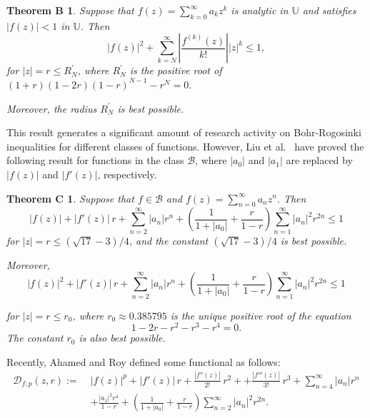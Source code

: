 \documentclass[11pt, reqno]{amsart}
\newtheorem*{theoB}{Theorem B}
\newtheorem*{theoC}{Theorem C}
\newtheorem*{cor A}{Corollary A}
\newtheorem*{cor B}{Corollary B}
\numberwithin{equation}{section}
\begin{document}
\begin{theoB}\cite[Corollary 2.3]{LSX2018}
Suppose that $f(z)=\sum_{k=0}^{\infty} a_k z^k$ is analytic in $\mathbb{U}$ and satisfies $|f(z)|<1$ in $\mathbb{U}$. Then
\[
|f(z)|^2+\sum_{k=N}^{\infty}\left|\frac{f^{(k)}(z)}{k!}\right|
|z|^k\leq 1,
\]
for $|z|=r\leq R_N^{\prime}$, where $R_N^{\prime}$ is the positive root of $(1+r)(1-2r)(1-r)^{N-1}-r^N=0.$ 

Moreover, the radius $R_N^{\prime}$ is best possible.
\end{theoB}
This result generates a significant amount of research activity on Bohr-Rogosinki inequalities for different classes of functions. However, Liu et al.~\cite[Theorem 7]{LLP2021} have proved the following result for functions in the class $\mathcal{B}$, where $|a_0|$ and $|a_1|$ are replaced by $|f(z)|$ and $|f'(z)|$, respectively.
\begin{theoC}
Suppose that $f\in\mathcal{B}$ and $f(z)=\sum_{n=0}^{\infty} a_n z^n.$
Then
\[
|f(z)|+|f'(z)|\,r+\sum_{n=2}^{\infty}|a_n|r^n+\left(\frac{1}{1+|a_0|}+\frac{r}{1-r}\right)\sum_{n=1}^{\infty}|a_n|^2r^{2n}\leq 1
\]
for $|z|=r\leq (\sqrt{17}-3)/4$, and the constant $(\sqrt{17}-3)/4$ is best possible.

Moreover,
\[
|f(z)|^2+|f'(z)|\,r+\sum_{n=2}^{\infty}|a_n|r^n+\left(\frac{1}{1+|a_0|}+\frac{r}{1-r}\right)\sum_{n=1}^{\infty}|a_n|^2r^{2n}\leq 1
\]

for $|z|=r\leq r_0$, where $r_0\approx 0.385795$ is the unique positive root of the equation
\[
1-2r-r^2-r^3-r^4=0.
\]
The constant $r_0$ is also best possible.
\end{theoC}
Recently, Ahamed and Roy \cite{AR2025} defined some functional as follows:
\begin{equation}
\begin{aligned}
\mathcal{D}_{f,p}(z,r)
:=\;& |f(z)|^p + |f'(z)|\,r
+\frac{|f''(z)|}{2!}\,r^2++\frac{|f'''(z)|}{3!}\,r^3
+\sum_{n=4}^{\infty}|a_n|r^n  \\
&+\frac{|a_1|^2 r^4}{1-r}
+\left(\frac{1}{1+|a_0|}+\frac{r}{1-r}\right)\sum_{n=2}^{\infty}|a_n|^2r^{2n}.
\end{aligned}
\end{equation}
\end{document}
